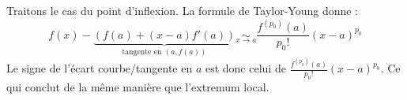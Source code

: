 \documentclass{article}
\begin{document}
\begin{question_kholle}
		Traitons le cas du point d'inflexion. La formule de Taylor-Young donne :
		\begin{equation}
			f(x) - \underbrace{\left( f(a) + (x-a)f'(a) \right)}_{\text{tangente en } (a,f(a))}
			\underset{x \rightarrow a}{\sim} \frac{f^{(p_0)}(a)}{p_0!} (x-a)^{p_0}
		\end{equation}
		Le signe de l'écart courbe/tangente en $a$ est donc celui de $\frac{f^{(p_0)}(a)}{p_0!} (x-a)^{p_0}$. Ce qui conclut de la même manière que l'extremum local.
	\end{question_kholle}
	
\end{document}
